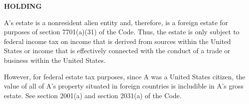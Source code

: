 \begin{select}
\begin{center}\textbf{HOLDING}
\end{center} 

  A's estate is a nonresident alien entity and, therefore, is a foreign estate for purposes of section 7701(a)(31) of the Code. Thus, the estate is only subject to federal income tax on income that is derived from sources within the United States or income that is effectively connected with the conduct of a trade or business within the United States.

  However, for federal estate tax purposes, since A was a United States citizen, the value of all of A's property situated in foreign countries is includible in A's gross estate.  See section 2001(a) and section 2031(a) of the Code.
\end{select}



